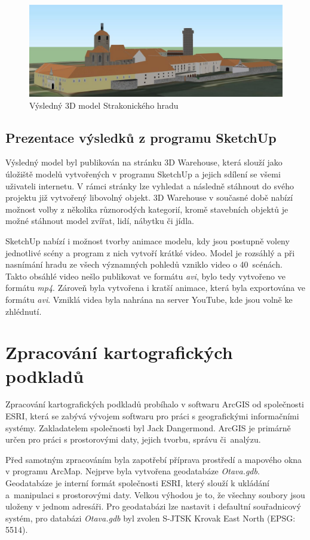 \documentclass[thesis=M,czech]{FITthesis}[2012/06/26]
\begin{document}
\begin{figure}[h]
	\centering
	\includegraphics[width=13cm]{pics/final_model.jpg}
	\caption{Výsledný 3D model Strakonického hradu}
	\label{obrazek:sk6}
\end{figure}

\clearpage

\subsection{Prezentace výsledků z programu SketchUp}
Výsledný model byl publikován na stránku 3D Warehouse, která slouží jako úložiště modelů vytvořených v programu SketchUp a jejich sdílení se všemi uživateli internetu. V rámci stránky lze vyhledat a následně stáhnout do svého projektu již vytvořený libovolný objekt. 3D Warehouse v současné době nabízí možnost volby z několika různorodých kategorií, kromě stavebních objektů je možné stáhnout model zvířat, lidí, nábytku či jídla. 

SketchUp nabízí i možnost tvorby animace modelu, kdy jsou postupně voleny jednotlivé scény a program z nich vytvoří krátké video. Model je rozsáhlý a při nasnímání hradu ze všech významných pohledů vzniklo video o 40~scénách. Takto obsáhlé video nešlo publikovat ve formátu \textit{avi}, bylo tedy vytvořeno ve formátu \textit{mp4}. Zároveň byla vytvořena i kratší animace, která byla exportována ve formátu \textit{avi}. Vzniklá videa byla nahrána na server YouTube, kde jsou volně ke zhlédnutí. 


\section{Zpracování kartografických podkladů}
Zpracování kartografických podkladů probíhalo v softwaru ArcGIS od společnosti ESRI, která se zabývá vývojem softwaru pro práci s geografickými informačními systémy. Zakladatelem společnosti byl Jack Dangermond. ArcGIS je primárně určen pro práci s prostorovými daty, jejich tvorbu, správu či~analýzu.

Před samotným zpracováním byla zapotřebí příprava prostředí a mapového okna v programu ArcMap. Nejprve byla vytvořena geodatabáze \textit{Otava.gdb}. Geodatabáze je interní formát společnosti ESRI, který slouží k ukládání a~manipulaci s prostorovými daty. Velkou výhodou je to, že všechny soubory jsou uloženy v jednom adresáři. Pro geodatabázi lze nastavit i defaultní souřadnicový systém, pro databázi \textit{Otava.gdb} byl zvolen S-JTSK Krovak East North (EPSG: 5514).
\end{document}
